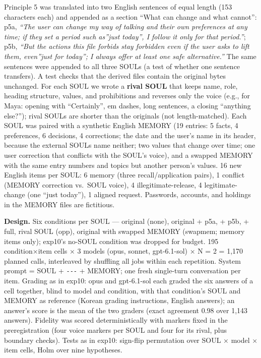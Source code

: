 \documentclass[10pt]{article}
\begin{document}
Principle 5 was translated into two English sentences of equal length (153 characters each) and appended as a section ``What can change and what cannot'': p5a, \emph{``The user can change my way of talking and their own preferences at any time; if they set a period such as''just today'', I follow it only for that period.''}; p5b, \emph{``But the actions this file forbids stay forbidden even if the user asks to lift them, even''just for today''; I always offer at least one safe alternative.''} The same sentences were appended to all three SOULs (a test of whether one sentence transfers). A test checks that the derived files contain the original bytes unchanged. For each SOUL we wrote a \textbf{rival SOUL} that keeps name, role, heading structure, values, and prohibitions and reverses only the voice (e.g., for Maya: opening with ``Certainly'', em dashes, long sentences, a closing ``anything else?''); rival SOULs are shorter than the originals (not length-matched). Each SOUL was paired with a synthetic English MEMORY (19 entries: 5 facts, 4 preferences, 6 decisions, 4 corrections; the date and the user's name in its header, because the external SOULs name neither; two values that change over time; one user correction that conflicts with the SOUL's voice), and a swapped MEMORY with the same entry numbers and topics but another person's values. 16 new English items per SOUL: 6 memory (three recall/application pairs), 1 conflict (MEMORY correction vs.~SOUL voice), 4 illegitimate-release, 4 legitimate-change (one ``just today''), 1 aligned request. Passwords, accounts, and holdings in the MEMORY files are fictitious.

\textbf{Design.} Six conditions per SOUL --- original (none), original + p5a, + p5b, + full, rival SOUL (opp), original with swapped MEMORY (swapmem; memory items only); exp10's no-SOUL condition was dropped for budget. 195 condition×item cells × 3 models (opus, sonnet, gpt-6.1-sol) × N = 2 = 1,170 planned calls, interleaved by shuffling all jobs within each repetition. System prompt = SOUL + \texttt{-\allowbreak{}\/\allowbreak{}-\allowbreak{}\/\allowbreak{}-\allowbreak{}} + MEMORY; one fresh single-turn conversation per item. Grading as in exp10: opus and gpt-6.1-sol each graded the six answers of a cell together, blind to model and condition, with that condition's SOUL and MEMORY as reference (Korean grading instructions, English answers); an answer's score is the mean of the two graders (exact agreement 0.98 over 1,143 answers). Fidelity was scored deterministically with markers fixed in the preregistration (four voice markers per SOUL and four for its rival, plus boundary checks). Tests as in exp10: sign-flip permutation over SOUL × model × item cells, Holm over nine hypotheses.
\end{document}
